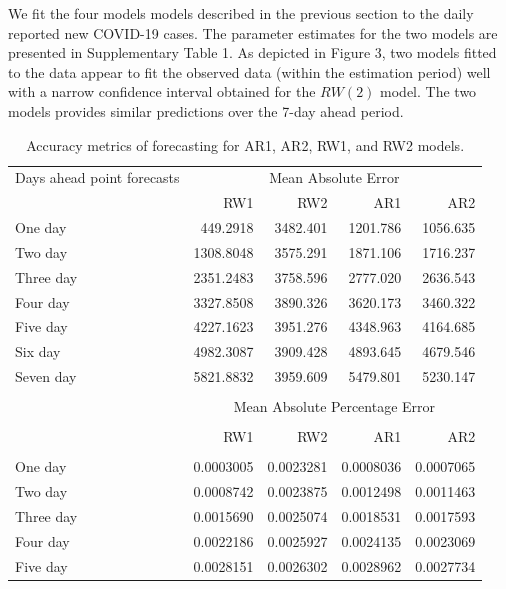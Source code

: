 \documentclass[10pt,letterpaper]{article}
\begin{document}
We fit the four models models described in the previous section to the daily
reported new COVID-19 cases. The parameter estimates for the two models
are presented in Supplementary Table 1. As depicted in Figure 3, two
models fitted to the data appear to fit the observed data (within the
estimation period) well with a narrow confidence interval obtained for
the \(RW(2)\) model. The two models provides similar predictions over
the 7-day ahead period.



\begin{table}[!h]
	
	\caption{\label{tab:Accuracy}Accuracy metrics of forecasting for AR1, AR2, RW1, and RW2 models.}
	\centering
	\begin{tabular}[t]{lrrrr}
		\hline
		Days ahead point forecasts & \multicolumn{4}{c}{Mean Absolute Error}\\
		\cline{2-5}
		& RW1 & RW2 & AR1 & AR2\\
		\hline
		One day & 449.2918 & 3482.401 & 1201.786 & 1056.635\\
		\hline
		Two day & 1308.8048 & 3575.291 & 1871.106 & 1716.237\\
		\hline
		Three day & 2351.2483 & 3758.596 & 2777.020 & 2636.543\\
		\hline
		Four day & 3327.8508 & 3890.326 & 3620.173 & 3460.322\\
		\hline
		Five day & 4227.1623 & 3951.276 & 4348.963 & 4164.685\\
		\hline
		Six day & 4982.3087 & 3909.428 & 4893.645 & 4679.546\\
		\hline
		Seven day & 5821.8832 & 3959.609 & 5479.801 & 5230.147\\
		\hline\\
		& \multicolumn{4}{c}{Mean Absolute Percentage Error}\\
		\cline{2-5}\\
		& RW1 & RW2 & AR1 & AR2\\
		\hline\\
		One day & 0.0003005 & 0.0023281 & 0.0008036 & 0.0007065\\
		\hline
		Two day & 0.0008742 & 0.0023875 & 0.0012498 & 0.0011463\\
		\hline
		Three day & 0.0015690 & 0.0025074 & 0.0018531 & 0.0017593\\
		\hline
		Four day & 0.0022186 & 0.0025927 & 0.0024135 & 0.0023069\\
		\hline
		Five day & 0.0028151 & 0.0026302 & 0.0028962 & 0.0027734\\

\end{tabular}
\end{table}
\end{document}
